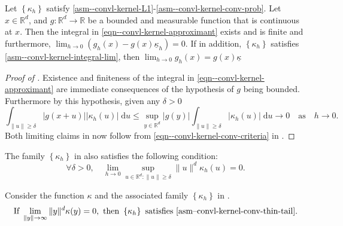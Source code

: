 \begin{theorem}
\label{thm--convl-kernel-conv-bounded}
Let \(\left\{ \kappa_{h} \right\}\) satisfy 
\ref{asm--convl-kernel-L1}-\ref{asm--convl-kernel-conv-prob}.
Let \(x \in \mathbb{R}^{d}\), and \(g : \mathbb{R}^{d} \to \mathbb{R}\)
be a bounded and measurable function that is continuous at \(x\).
Then the integral in \eqref{eqn--convl-kernel-approximant} exists and is finite
and furthermore, \(\lim_{h \to 0} \left( g_{h} (x) - g (x)
\underline{\kappa}_{h} \right) = 0\).
If in addition, \(\left\{ \kappa_{h} \right\}\) satisfies
 \ref{asm--convl-kernel-integral-lim}, then
\(\lim_{h \to 0} g_{h} (x) = g (x) \underline{\kappa}\)
\end{theorem}

\begin{proof}[Proof of ]
Existence and finiteness of the integral in
\eqref{eqn--convl-kernel-approximant} are immediate consequences of the
hypothesis of \(g\) being bounded.
Furthermore by this hypothesis, given any \(\delta > 0\)
\begin{equation*}
  \int_{\|u\| \geq \delta} |g (x + u)| \left| \kappa_{h} (u) \right| \;
  \mathrm{d} u \leq \sup_{y \in \mathbb{R}^{d}} |g (y)| \int_{\|u\| \geq \delta}
  \left| \kappa_{h} (u) \right| \; \mathrm{d} u \to 0 \quad \text{as} \quad h
  \to 0.
\end{equation*}
Both limiting claims in  now follow from
\eqref{eqn--convl-kernel-conv-criteria} in
.
\end{proof}

\begin{assumption}
\label{asm--convl-kernel-conv-thin-tail}
The family \(\left\{ \kappa_{h} \right\}\) in
 also satisfies the following condition:
\begin{equation}
  \forall \delta > 0, \quad
  \lim_{h \to 0} \sup_{u \in \mathbb{R}^{d} : \|u\| \geq \delta} \|u\|^{d}
  \kappa_{h} (u) = 0.
  \label{eqn--conv-kernel-thin-tail-condition}
\end{equation}
\end{assumption}

\begin{lemma}
\label{lem--convl-kernel-eg-thin-tail}
Consider the function \(\kappa\) and the associated family \(\left\{ \kappa_{h}
\right\}\) in .
\begin{equation}
  \text{If } \lim_{\|y\| \to \infty} \|y\|^{d} \kappa (y) = 0, \text{ then }
  \left\{ \kappa_{h} \right\} \text{ satisfies
  \Cref{asm--convl-kernel-conv-thin-tail}.}
  \label{eqn--conv-kernel-thin-tail-condition-1}
\end{equation}
\end{lemma}

